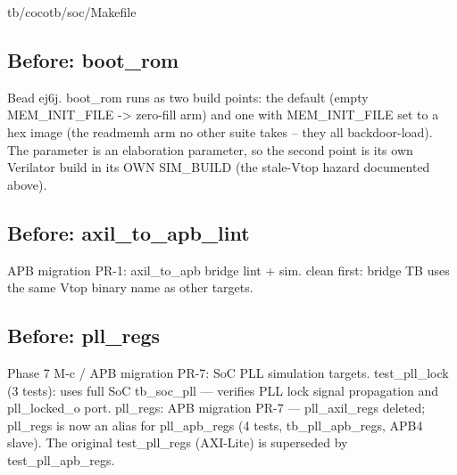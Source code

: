 \begin{relocated}{tb/cocotb/soc/Makefile}

\subsection*{Before: boot\_rom}

\begin{textblock}
Bead ej6j.  boot_rom runs as two build points: the default (empty MEM_INIT_FILE -> zero-fill arm)
and one with MEM_INIT_FILE set to a hex image (the $$readmemh arm no other suite takes -- they all
backdoor-load).  The parameter is an elaboration parameter, so the second point is its own
Verilator build in its OWN SIM_BUILD (the stale-Vtop hazard documented above).
\end{textblock}

\subsection*{Before: axil\_to\_apb\_lint}

\begin{textblock}
APB migration PR-1: axil_to_apb bridge lint + sim.
clean first: bridge TB uses the same Vtop binary name as other targets.
\end{textblock}

\subsection*{Before: pll\_regs}

\begin{textblock}
Phase 7 M-c / APB migration PR-7: SoC PLL simulation targets.
test_pll_lock (3 tests): uses full SoC tb_soc_pll — verifies PLL lock
  signal propagation and pll_locked_o port.
pll_regs: APB migration PR-7 — pll_axil_regs deleted; pll_regs is now an
  alias for pll_apb_regs (4 tests, tb_pll_apb_regs, APB4 slave).
  The original test_pll_regs (AXI-Lite) is superseded by test_pll_apb_regs.
\end{textblock}


\end{relocated}
